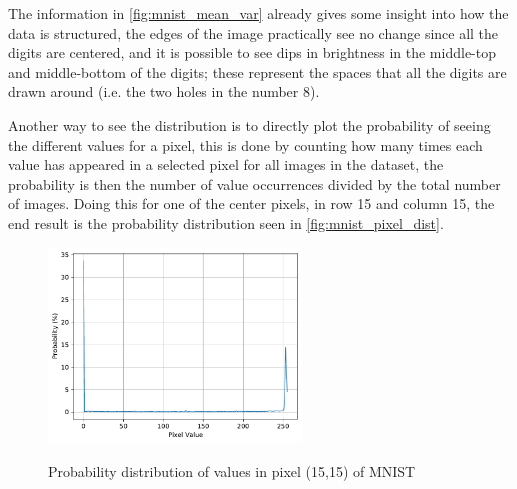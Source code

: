 The information in \autoref{fig:mnist_mean_var} already gives some insight into how the data is structured, the edges of the image practically see no change since all the digits are centered, and it is possible to see dips in brightness in the middle-top and middle-bottom of the digits; these represent the spaces that all the digits are drawn around (i.e. the two holes in the number $8$).

Another way to see the distribution is to directly plot the probability of seeing the different values for a pixel, this is done by counting how many times each value has appeared in a selected pixel for all images in the dataset, the probability is then the number of value occurrences divided by the total number of images. Doing this for one of the center pixels, in row 15 and column 15, the end result is the probability distribution seen in \autoref{fig:mnist_pixel_dist}.
\begin{figure}[hbt]
    \centering
    \caption{Probability distribution of values in pixel (15,15) of \gls{MNIST}}
    \includegraphics[width=0.6\textwidth]{chapters/GANs/figures/mnist_dist_pixel_14x14.pdf}
    \label{fig:mnist_pixel_dist}
\end{figure}

